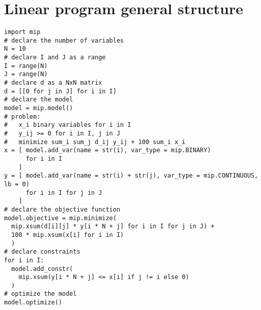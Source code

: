 \section{Linear program general structure}
\begin{lstlisting}[style=Python]
import mip
# declare the number of variables
N = 10
# declare I and J as a range
I = range(N)
J = range(N)
# declare d as a NxN matrix
d = [[0 for j in J] for i in I]
# declare the model
model = mip.model()
# problem:
#   x_i binary variables for i in I
#   y_ij >= 0 for i in I, j in J
#   minimize sum_i sum_j d_ij y_ij + 100 sum_i x_i
x = [ model.add_var(name = str(i), var_type = mip.BINARY)
      for i in I 
    ]
y = [ model.add_var(name = str(i) + str(j), var_type = mip.CONTINUOUS, lb = 0)
      for i in I for j in J 
    ]
# declare the objective function
model.objective = mip.minimize(
  mip.xsum(d[i][j] * y[i * N + j] for i in I for j in J) +
  100 * mip.xsum(x[i] for i in I)
  )
# declare constraints
for i in I:
  model.add_constr(
    mip.xsum(y[i * N + j] <= x[i] if j != i else 0)
  )
# optimize the model
model.optimize()
\end{lstlisting}
